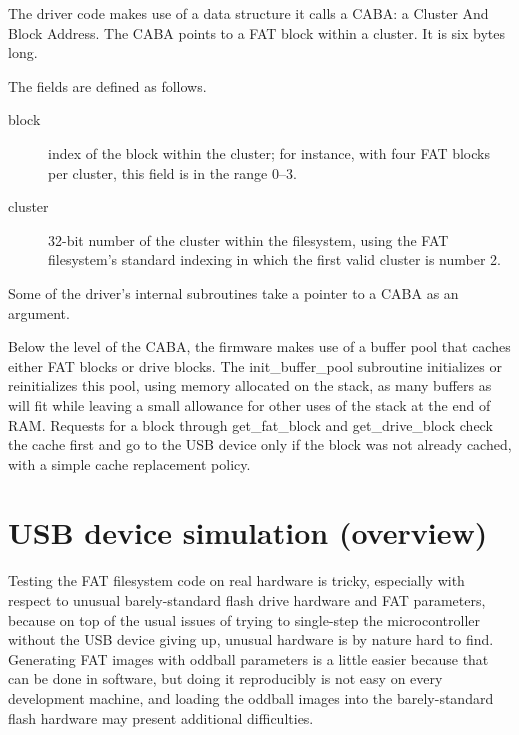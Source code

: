 The driver code makes use of a data structure it calls a CABA:  a Cluster
And Block Address.  The CABA points to a FAT block within a cluster.  It is
six bytes long.


The fields are defined as follows.

\begin{description}
  \item[block] index of the block within the cluster; for instance, with
    four FAT blocks per cluster, this field is in the range 0--3.
  \item[cluster] 32-bit number of the cluster within the filesystem,
    using the FAT filesystem's standard indexing in which the first valid
    cluster is number 2.
\end{description}

Some of the driver's internal subroutines take a pointer to a CABA as an
argument.

Below the level of the CABA, the firmware makes use of a buffer pool that
caches either FAT blocks or drive blocks.  The init\_buffer\_pool subroutine
initializes or reinitializes this pool, using memory allocated on the stack,
as many buffers as will fit while leaving a small allowance for other uses
of the stack at the end of RAM.  Requests for a block through
get\_fat\_block and get\_drive\_block check the cache first and go to the
USB device only if the block was not already cached, with a simple cache
replacement policy.

\section{USB device simulation (overview)}

Testing the FAT filesystem code on real hardware is tricky, especially with
respect to unusual barely-standard flash drive hardware and FAT parameters,
because on top of the usual issues of trying to single-step the
microcontroller without the USB device giving up, unusual hardware is by
nature hard to find.  Generating FAT images with oddball parameters is a
little easier because that can be done in software, but doing it reproducibly
is not easy on every development machine, and loading the oddball images
into the barely-standard flash hardware may present additional difficulties.

